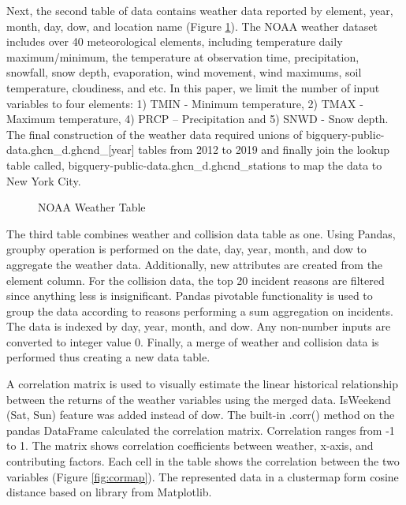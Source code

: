 \documentclass[conference]{IEEEtran}
\begin{document}
Next, the second table of data contains weather data reported by element, year, month, day, dow, and location name (Figure \ref{fig:noaatable}). The NOAA weather dataset includes over 40 meteorological elements\cite{NoaaRef}, including temperature daily maximum/minimum, the temperature at observation time, precipitation, snowfall, snow depth, evaporation, wind movement, wind maximums, soil temperature, cloudiness, and etc. In this paper, we limit the number of input variables to four elements: 1) TMIN - Minimum temperature, 2) TMAX - Maximum temperature, 4) PRCP – Precipitation and 5) SNWD - Snow depth. The final construction of the weather data required unions of bigquery-public-data.ghcn\_d.ghcnd\_[year] tables from 2012 to 2019 and finally join the lookup table called, bigquery-public-data.ghcn\_d.ghcnd\_stations to map the data to New York City.  
\begin{figure}[bth]
	\centering
	\caption{NOAA Weather Table}
	\label{fig:noaatable}
\end{figure}

The third table combines weather and collision data table as one. Using Pandas, groupby operation is performed on the date, day, year, month, and dow to aggregate the weather data. Additionally, new attributes are created from the element column. For the collision data, the top 20 incident reasons are filtered since anything less is insignificant. Pandas pivotable functionality is used to group the data according to reasons performing a sum aggregation on incidents. The data is indexed by day, year, month, and dow. Any non-number inputs are converted to integer value 0. Finally, a merge of weather and collision data is performed thus creating a new data table. 
 
A correlation matrix is used to visually estimate the linear historical relationship between the returns of the weather variables using the merged data. IsWeekend (Sat, Sun) feature was added instead of dow. The built-in .corr() method on the pandas DataFrame calculated the correlation matrix. Correlation ranges from -1 to 1. The matrix shows correlation coefficients between weather, x-axis, and contributing factors. Each cell in the table shows the correlation between the two variables (Figure \ref{fig:cormap}).  The represented data in a clustermap form cosine distance based on library from Matplotlib.
\end{document}
